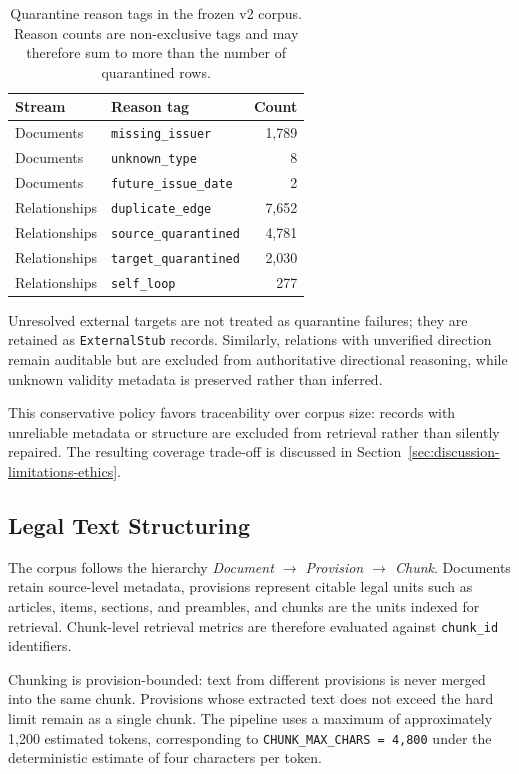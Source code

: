 \begin{table}[t]
\centering
\small
\caption{Quarantine reason tags in the frozen v2 corpus. Reason counts are non-exclusive tags and may therefore sum to more than the number of quarantined rows.}
\label{tab:quarantine-reasons}
\begin{tabular}{llr}
\toprule
\textbf{Stream} & \textbf{Reason tag} & \textbf{Count} \\
\midrule
Documents & \texttt{missing\_issuer} & 1,789 \\
Documents & \texttt{unknown\_type} & 8 \\
Documents & \texttt{future\_issue\_date} & 2 \\
\midrule
Relationships & \texttt{duplicate\_edge} & 7,652 \\
Relationships & \texttt{source\_quarantined} & 4,781 \\
Relationships & \texttt{target\_quarantined} & 2,030 \\
Relationships & \texttt{self\_loop} & 277 \\
\bottomrule
\end{tabular}
\end{table}

Unresolved external targets are not treated as quarantine failures; they are retained as \texttt{ExternalStub} records. Similarly, relations with unverified direction remain auditable but are excluded from authoritative directional reasoning, while unknown validity metadata is preserved rather than inferred.

This conservative policy favors traceability over corpus size: records with unreliable metadata or structure are excluded from retrieval rather than silently repaired. The resulting coverage trade-off is discussed in Section~\ref{sec:discussion-limitations-ethics}.

\subsection{Legal Text Structuring}
\label{sec:text-structuring}

The corpus follows the hierarchy
\textit{Document $\rightarrow$ Provision $\rightarrow$ Chunk}.
Documents retain source-level metadata, provisions represent citable legal units such as articles, items, sections, and preambles, and chunks are the units indexed for retrieval. Chunk-level retrieval metrics are therefore evaluated against \texttt{chunk\_id} identifiers.

Chunking is provision-bounded: text from different provisions is never merged into the same chunk. Provisions whose extracted text does not exceed the hard limit remain as a single chunk. The pipeline uses a maximum of approximately 1,200 estimated tokens, corresponding to \texttt{CHUNK\_MAX\_CHARS = 4,800} under the deterministic estimate of four characters per token.

